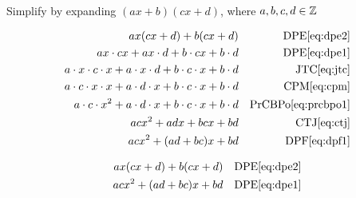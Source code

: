 \begin{example}[id:20141109-141347] \label{20141109-141347}  \hfill \\

Simplify by expanding  $(ax+b)(cx+d)$, where $a, b, c, d \in \mathbb{Z}$

\soln

\solnsteps
\begin{align*}
ax(cx+d)+b(cx+d)  && \text{DPE} \eqref{eq:dpe2} \\
ax \cdot cx + ax \cdot d + b \cdot cx + b \cdot d && \text{DPE} \eqref{eq:dpe1} \\
a \cdot x \cdot c \cdot x + a \cdot x \cdot d + b \cdot c \cdot x + b \cdot d   && \text{JTC} \eqref{eq:jtc} \\
a \cdot c \cdot x \cdot x + a \cdot d \cdot x + b \cdot c \cdot x + b \cdot d  && \text{CPM} \eqref{eq:cpm} \\
a \cdot c \cdot x^2 + a \cdot d \cdot x + b \cdot c \cdot x + b \cdot d  && \text{PrCBPo} \eqref{eq:prcbpo1} \\
acx^2 + adx + bcx + bd  && \text{CTJ} \eqref{eq:ctj} \\
acx^2 + (ad+bc)x + bd  && \text{DPF} \eqref{eq:dpf1} 
\end{align*}

\soln

\lesssteps
\begin{align*}
ax(cx+d)+b(cx+d) && \text{DPE} \eqref{eq:dpe2} \\
acx^2 + (ad+bc)x + bd && \text{DPE} \eqref{eq:dpe1} 
\end{align*}

\end{example}


